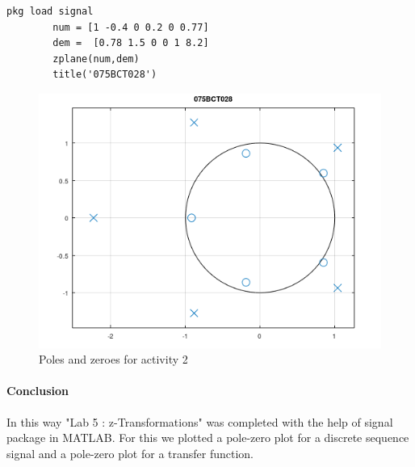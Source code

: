 \documentclass[12pt]{article}
\begin{document}
\begin{enumerate}
    \begin{Verbatim}[frame=single]
        pkg load signal
        num = [1 -0.4 0 0.2 0 0.77]
        dem =  [0.78 1.5 0 0 1 8.2]
        zplane(num,dem)
        title('075BCT028')
            \end{Verbatim}
            \begin{figure}[h!]
                \centering
                \includegraphics{labss/Lab5_2.PNG}
                \caption{Poles and zeroes for activity 2}
            \end{figure}
            \pagebreak
\end{enumerate}
\paragraph{Conclusion\\}
In this way "Lab 5 : z-Transformations" was completed with the help of signal package in MATLAB.
For this we plotted a pole-zero plot for a discrete sequence signal and a pole-zero plot for a transfer function.   
\end{document}
